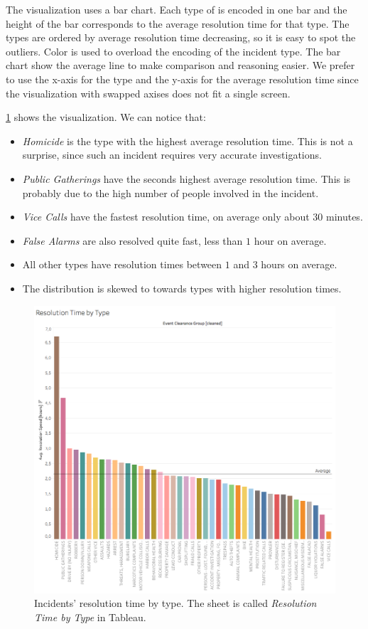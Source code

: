 The visualization uses a bar chart.
Each type of is encoded in one bar and the height of the bar corresponds to the average resolution time for that type.
The types are ordered by average resolution time decreasing, so it is easy to spot the outliers.
Color is used to overload the encoding of the incident type.
The bar chart show the average line to make comparison and reasoning easier.
We prefer to use the x-axis for the type and the y-axis for the average resolution time since the visualization with swapped axises does not fit a single screen.

\cref{fig:3_2_resolution_speed_by_type} shows the visualization.
We can notice that:
\begin{itemize}
    \item \textit{Homicide} is the type with the highest average resolution time. This is not a surprise, since such an incident requires very accurate investigations.
    \item \textit{Public Gatherings} have the seconds highest average resolution time. This is probably due to the high number of people involved in the incident.
    \item \textit{Vice Calls} have the fastest resolution time, on average only about $30$ minutes.
    \item \textit{False Alarms} are also resolved quite fast, less than $1$ hour on average.
    \item All other types have resolution times between $1$ and $3$ hours on average.
    \item The distribution is skewed to towards types with higher resolution times.
\end{itemize}

\begin{figure}[h]
	\centering
	\includegraphics[width=\columnwidth]{figures/3_2_resolution_speed_by_type}
	\caption{Incidents' resolution time by type. The sheet is called \textit{Resolution Time by Type} in Tableau.}
	\label{fig:3_2_resolution_speed_by_type}
\end{figure}


